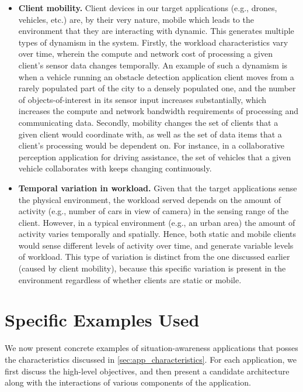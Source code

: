 \begin{itemize}
\item \textbf{Client mobility.} Client devices in our target applications (e.g., drones, vehicles, etc.) are, by their very nature, mobile which leads to the environment that they are interacting with dynamic. This generates multiple types of dynamism in the system. Firstly, the workload characteristics vary over time, wherein the compute and network cost of processing a given client's sensor data changes temporally. An example of such a dynamism is when a vehicle running an obstacle detection application client moves from a rarely populated part of the city to a densely populated one, and the number of objects-of-interest in its sensor input increases substantially, which increases the compute and network bandwidth requirements of processing and communicating data. Secondly, mobility changes the set of clients that a given client would coordinate with, as well as the set of data items that a client's processing would be dependent on. For instance, in a collaborative perception application for driving assistance, the set of vehicles that a given vehicle collaborates with keeps changing continuously.

\item \textbf{Temporal variation in workload.} Given that the target applications sense the physical environment, the workload served depends on the amount of activity (e.g., number of cars in view of camera) in the sensing range of the client. However, in a typical environment (e.g., an urban area) the amount of activity varies temporally and spatially. Hence, both static and mobile clients would sense different levels of activity over time, and generate variable levels of workload. This type of variation is distinct from the one discussed earlier (caused by client mobility), because this specific variation is present in the environment regardless of whether clients are static or mobile.
\end{itemize}
\section{Specific Examples Used}
We now present concrete examples of situation-awareness applications that posses the characteristics discussed in \cref{sec:app_characteristics}. For each application, we first discuss the high-level objectives, and then present a candidate architecture along with the interactions of various components of the application. 
